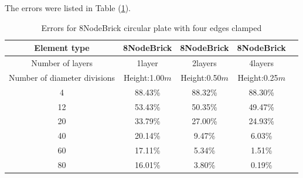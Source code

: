 \documentclass[fleqn,11pt,letter]{article}
\begin{document}
The errors were listed in Table (\ref{table errors for 8NodeBrick circular plate with four edges clamped}).

\begin{table}[H]
  \centering
      \caption{Errors for 8NodeBrick circular plate with four edges clamped}
  \label{table errors for 8NodeBrick circular plate with four edges clamped}
\begin{tabular}{|c|c|c|c|c|}
\hline
Element type     & 8NodeBrick     & 8NodeBrick     & 8NodeBrick      \\ \hline
Number of layers & 1layer         & 2layers         & 4layers          \\ \hline
Number of diameter divisions & Height:1.00$m$ & Height:0.50$m$ & Height:0.25$m$  \\ \hline
4           & 88.43\% & 88.32\% & 88.30\%       \\ \hline
12          & 53.43\% & 50.35\% & 49.47\%       \\ \hline
20          & 33.79\% & 27.00\% & 24.93\%       \\ \hline
40          & 20.14\% & 9.47\%  & 6.03\%        \\ \hline
60          & 17.11\% & 5.34\%  & 1.51\%        \\ \hline
80          & 16.01\% & 3.80\%  & 0.19\%        \\
\hline
\end{tabular}
\end{table}


\end{document}
